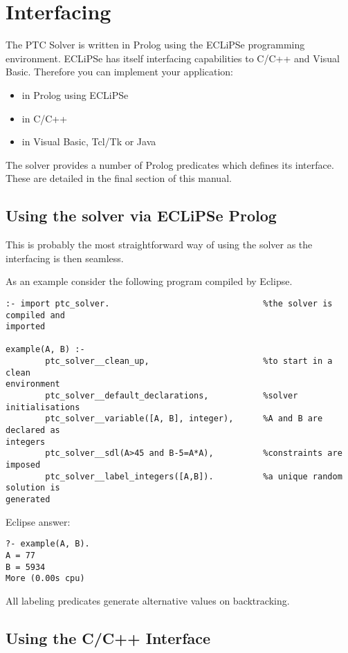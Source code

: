 \documentclass{article}
\begin{document}
\section{Interfacing}

The PTC Solver is written in Prolog using the ECLiPSe programming environment.
ECLiPSe has itself interfacing capabilities to C/C++ and Visual Basic.
Therefore you can implement your application:

\begin{itemize}
\item in Prolog using ECLiPSe
\item in C/C++
\item in Visual Basic, Tcl/Tk or Java
\end{itemize}

The solver provides a number of Prolog predicates which
defines its interface. These are detailed in the final
section of this manual.

\subsection{Using the solver via ECLiPSe Prolog}

This is probably the most straightforward way of using the solver as the
interfacing is
then seamless.

As an example consider the following program compiled by Eclipse.

\begin{verbatim}
:- import ptc_solver.                               %the solver is compiled and
imported

example(A, B) :-
        ptc_solver__clean_up,                       %to start in a clean
environment
        ptc_solver__default_declarations,           %solver initialisations
        ptc_solver__variable([A, B], integer),      %A and B are declared as
integers
        ptc_solver__sdl(A>45 and B-5=A*A),          %constraints are imposed
        ptc_solver__label_integers([A,B]).          %a unique random solution is
generated
\end{verbatim}

Eclipse answer:

\begin{verbatim}
?- example(A, B).
A = 77
B = 5934
More (0.00s cpu)
\end{verbatim}

All labeling predicates generate alternative values on
backtracking.

\subsection{Using the C/C++ Interface}
\end{document}
